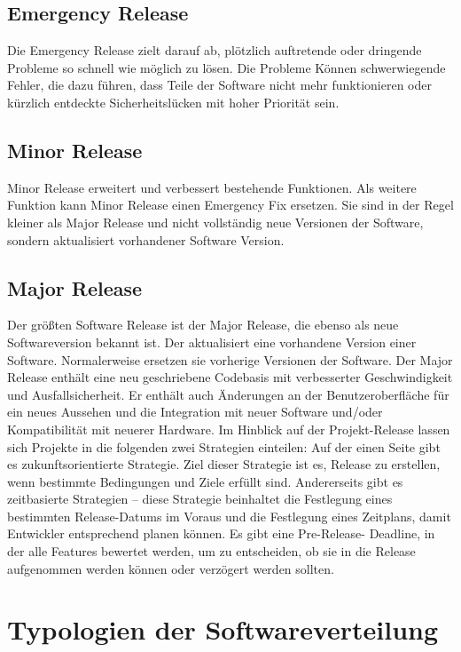 \subsection{Emergency Release}

Die Emergency Release zielt darauf ab, plötzlich auftretende oder dringende Probleme so schnell wie möglich zu lösen. Die Probleme Können schwerwiegende Fehler, die dazu führen, dass Teile der Software nicht mehr funktionieren oder kürzlich entdeckte Sicherheitslücken mit hoher Priorität sein.

\subsection{Minor Release}

Minor Release erweitert und verbessert bestehende Funktionen. Als weitere Funktion
kann Minor Release einen Emergency Fix ersetzen. Sie sind in der Regel kleiner als Major Release und nicht vollständig neue Versionen der Software, sondern aktualisiert vorhandener Software Version.

\subsection{Major Release}

Der größten Software Release ist der Major Release, die ebenso als neue Softwareversion bekannt ist. Der aktualisiert eine vorhandene Version einer Software. Normalerweise ersetzen sie vorherige Versionen der Software. Der Major Release enthält eine neu geschriebene Codebasis mit verbesserter Geschwindigkeit und Ausfallsicherheit. Er enthält auch Änderungen an der Benutzeroberfläche für ein neues Aussehen und die Integration mit neuer Software und/oder Kompatibilität mit neuerer Hardware.
Im Hinblick auf der Projekt-Release lassen sich Projekte in die folgenden zwei Strategien einteilen: 
\newline
Auf der einen Seite gibt es zukunftsorientierte Strategie. Ziel dieser Strategie ist es, Release zu erstellen, wenn bestimmte Bedingungen und Ziele erfüllt sind. Andererseits gibt es zeitbasierte Strategien – diese Strategie beinhaltet die
Festlegung eines bestimmten Release-Datums im Voraus und die Festlegung eines
Zeitplans, damit Entwickler entsprechend planen können. Es gibt eine Pre-Release-
Deadline, in der alle Features bewertet werden, um zu entscheiden, ob sie in die
Release aufgenommen werden können oder verzögert werden sollten.

\section{Typologien der Softwareverteilung}

